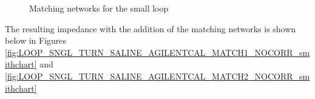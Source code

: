 \documentclass[12pt,onecolumn,titlepage]{article}
\begin{document}
\begin{figure}[h!]
	\centering
	\label{fig:Loop_sngl_turn_saline_agilentcal_match}
	\caption{Matching networks for the small loop}
\end{figure}

The resulting impedance with the addition of the matching networks is shown below in Figures \ref{fig:LOOP_SNGL_TURN_SALINE_AGILENTCAL_MATCH1_NOCORR_smithchart} and \ref{fig:LOOP_SNGL_TURN_SALINE_AGILENTCAL_MATCH2_NOCORR_smithchart}
\end{document}
